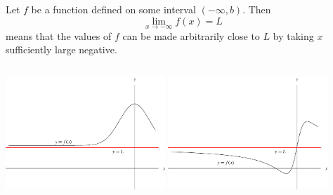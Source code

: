 \begin{frame}[t]
\begin{definition}
Let $f$ be a function defined on some interval $(- \infty , b)$.  Then
\[
\lim_{x\rightarrow -\infty} f(x) = L
\]
means that the values of $f$ can be made arbitrarily close to $L$ by taking $x$ sufficiently large negative.
\end{definition}
\begin{columns}[c]
\includegraphics[width=6cm]{curve-sketching/pictures/04-04-negasymptotesa.pdf}%
\includegraphics[width=6cm]{curve-sketching/pictures/04-04-negasymptotesb.pdf}%
\end{columns}
\end{frame}
